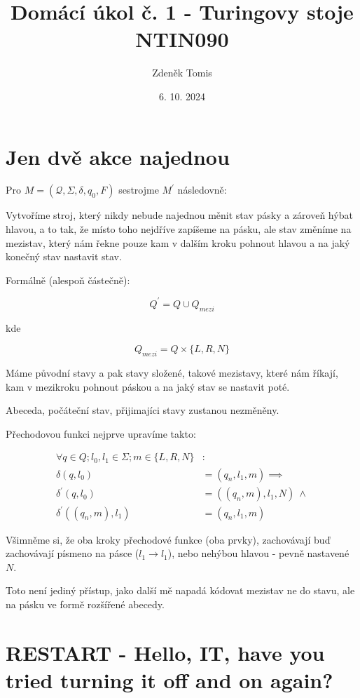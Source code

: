 \documentclass{article}
\title{%
    Domácí úkol č. 1 - Turingovy stoje \\
    NTIN090
}
\author{Zdeněk Tomis}
\date{6. 10. 2024}
\begin{document}
\maketitle


\section{ Jen dvě akce najednou}

Pro \( M = (\mathcal{Q}, \Sigma, \delta, q_0, F ) \) sestrojme \(M^\prime\) následovně:  

Vytvoříme stroj, který nikdy nebude najednou měnit stav pásky a zároveň hýbat hlavou, a to tak, že místo toho nejdříve zapíšeme na pásku, ale stav změníme na mezistav, který nám řekne pouze kam v dalším kroku pohnout hlavou a na jaký konečný stav nastavit stav.

Formálně (alespoň částečně):

\[ Q^\prime = Q \cup Q_{mezi} \]

kde 

\[ Q_{mezi} = Q \times \{ L,R,N \}  \]

Máme původní stavy a pak stavy složené, takové mezistavy, které nám říkají, kam v mezikroku pohnout páskou a na jaký stav se nastavit poté.

Abeceda, počáteční stav, přijimajíci stavy zustanou nezměněny.

Přechodovou funkci nejprve upravíme takto:

\begin{align*} \forall q \in Q; l_0,l_1 \in \Sigma; m \in \{ L,R,N \}&: \\
 \delta(q,l_0) &= (q_n, l_1,  m) \implies \\
 \delta^\prime(q,l_0) &= ( (q_n, m), l_1, N) \  \wedge \\
 \delta^\prime((q_n, m), l_1) &= (q_n, l_1, m)    
\end{align*}

Všimněme si, že oba kroky přechodové funkce (oba prvky), zachovávají buď zachovávají písmeno na pásce ($ l_1 \to l_1 $), nebo nehýbou hlavou - pevně nastavené $N$.

Toto není jediný přístup, jako další mě napadá kódovat mezistav ne do stavu, ale na pásku ve formě rozšířené abecedy.


\section{RESTART - Hello, IT, have you tried turning it off and on again?}
\end{document}
